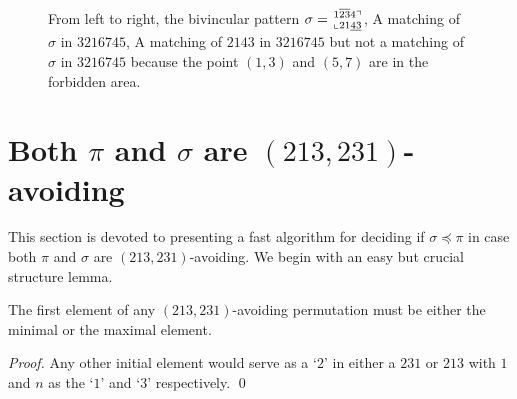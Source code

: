 \documentclass[a4paper]{llncs}
\newcommand\BV[2]{\genfrac{}{}{0pt}{}{#1}{#2}}
\begin{document}
\begin{figure}[t]
    	 
    	 
    	    	
    	\caption[Example pattern matching]{
    		From left to right,
    		the bivincular pattern $\sigma = \BV{1\overline{23}4\urcorner}{\llcorner 21\underline{43}  }$, A matching of $\sigma$ in $3216745$, A matching of $2143$ in $3216745$ but not a matching of $\sigma$ in $3216745$ because the point $(1,3)$ and $(5,7)$ are in the forbidden area.} 
    	\label{example:bivincular pattern matching}
\end{figure}


\section{Both $\pi$ and $\sigma$ are $(213,231)$-avoiding}
\label{section:both are (213,231)-avoiding}



This section is devoted to presenting a fast algorithm for deciding if
$\sigma \preceq \pi$
in case both $\pi$ and $\sigma$ are $(213,231)$-avoiding.
We begin with an easy but crucial structure lemma.

\begin{lemma}[Folklore]
\label{lemma:first element is 1 or n}
The first element of any $(213,231)$-avoiding permutation
must be either the minimal or the maximal element.
\end{lemma}

\begin{proof}
Any other initial element would serve as a `$2$' in either a
$231$ or $213$ with $1$ and $n$ as the `$1$' and `$3$' respectively.
\qed
\end{proof}
\end{document}
